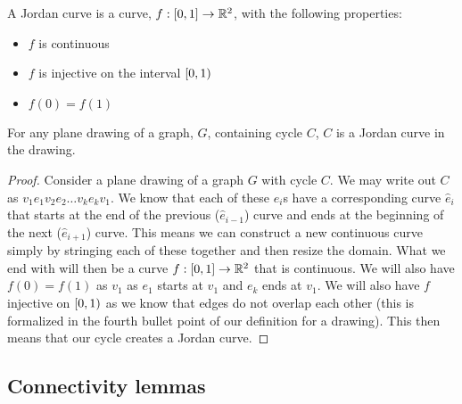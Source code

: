 \documentclass{article}
\begin{document}
\begin{definition}
	A Jordan curve is a curve, $f:\left[ {0} , {1} \right]\to \mathbb R^2$, with the following properties:
	\begin{itemize}
		\item $f$ is continuous
		\item $f$ is injective on the interval $\left[ {0} , {1} \right)$
		\item $f(0) = f(1)$
	\end{itemize}
\end{definition}
\begin{lemma}
	For any plane drawing of a graph, $G$, containing cycle $C$, $C$ is a Jordan curve in the drawing.
\end{lemma}
\begin{proof}
	Consider a plane drawing of a graph $G$ with cycle $C$. We may write out $C$ as $v_1e_1v_2e_2\ldots v_ke_kv_1$. We know that each of these $e_i$s have a corresponding curve $\hat e_i$ that starts at the end of the previous ($\hat e_{i-1}$) curve and ends at the beginning of the next ($\hat e_{i+1}$) curve. This means we can construct a new continuous curve simply by stringing each of these together and then resize the domain. What we end with will then be a curve $f:\left[ {0} , {1} \right]\to\mathbb R^2$ that is continuous. We will also have $f(0) = f(1)$ as $v_1$ as $e_1$ starts at $v_1$ and $e_k$ ends at $v_1$. We will also have $f$ injective on $\left[ {0} , {1} \right)$ as we know that edges do not overlap each other (this is formalized in the fourth bullet point of our definition for a drawing). This then means that our cycle creates a Jordan curve.
\end{proof}


\subsection{Connectivity lemmas}
\end{document}
